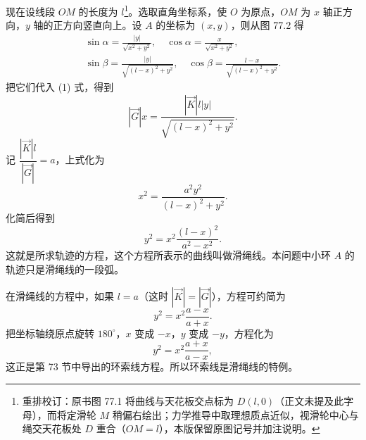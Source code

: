 现在设线段 $OM$ 的长度为 $l$\footnote{重排校订：原书图 77.1 将曲线与天花板交点标为 $D(l,0)$（正文未提及此字母），而将定滑轮 $M$ 稍偏右绘出；力学推导中取理想质点近似，视滑轮中心与绳交天花板处 $D$ 重合（$OM=l$），本版保留原图记号并加注说明。}。选取直角坐标系，使 $O$ 为原点，$OM$ 为 $x$ 轴正方向，$y$ 轴的正方向竖直向上。设 $A$ 的坐标为 $(x,y)$，则从图 77.2 得
\begin{gather*}
  \sin\alpha = \frac{|y|}{\sqrt{x^2+y^2}},\quad \cos\alpha = \frac{x}{\sqrt{x^2+y^2}}, \\
  \sin\beta = \frac{|y|}{\sqrt{(l-x)^2+y^2}},\quad \cos\beta = \frac{l-x}{\sqrt{(l-x)^2+y^2}}.
\end{gather*}
把它们代入 (1) 式，得到
\[
  |\vec{G}|x = \frac{|\vec{K}|l|y|}{\sqrt{(l-x)^2+y^2}}.
\]
记 $\dfrac{|\vec{K}|l}{|\vec{G}|}=a$，上式化为
\[
  x^2 = \frac{a^2y^2}{(l-x)^2+y^2}.
\]
化简后得到
\begin{equation*}
  y^2 = x^2\frac{(l-x)^2}{a^2-x^2}. \tag{2}
\end{equation*}
这就是所求轨迹的方程，这个方程所表示的曲线叫做滑绳线。本问题中小环 $A$ 的轨迹只是滑绳线的一段弧。

在滑绳线的方程中，如果 $l=a$（这时 $|\vec{K}|=|\vec{G}|$），方程可约简为
\[
  y^2 = x^2\frac{a-x}{a+x}.
\]
把坐标轴绕原点旋转 $180^\circ$，$x$ 变成 $-x$，$y$ 变成 $-y$，方程化为
\[
  y^2 = x^2\frac{a+x}{a-x},
\]
这正是第 73 节中导出的环索线方程。所以环索线是滑绳线的特例。
